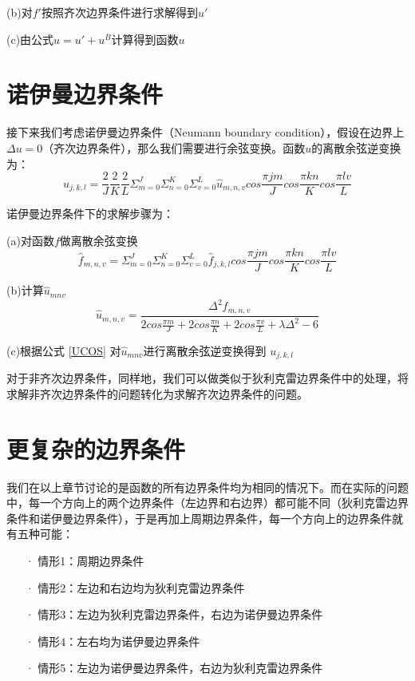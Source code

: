 (b)对$f'$按照齐次边界条件进行求解得到$u'$  

(c)由公式$u = u' + u^{B}$计算得到函数$u$

\section{诺伊曼边界条件}
接下来我们考虑诺伊曼边界条件（Neumann boundary condition），假设在边界上$\Delta u = 0$（齐次边界条件），那么我们需要进行余弦变换。函数$u$的离散余弦逆变换为：
\begin{equation} \label{UCOS}
u_{j,k,l}=\frac{2}{J}\frac{2}{K}\frac{2}{L}\Sigma_{m=0}^{J}\Sigma_{n=0}^{K}\Sigma_{v=0}^{L}
\hat{u}_{m,n,v}cos\frac{\pi jm}{J}cos\frac{\pi kn}{K}cos\frac{\pi lv}{L}
\end{equation}  

诺伊曼边界条件下的求解步骤为：  

(a)对函数$f$做离散余弦变换
\begin{equation}
\hat{f}_{m,n,v}=\Sigma_{m=0}^{J}\Sigma_{n=0}^{K}\Sigma_{v=0}^{L}
\hat{f}_{j,k,l}cos\frac{\pi jm}{J}cos\frac{\pi kn}{K}cos\frac{\pi lv}{L}
\end{equation}  

(b)计算$\hat{u}_{mnv}$
\begin{equation} \label{UMNV3}
\hat{u}_{m,n,v}= \frac{\Delta^2 \hat{f}_{m,n,v}}
{2cos\frac{\pi m}{J}+2cos\frac{\pi n}{K}+2cos\frac{\pi v}{L} + \lambda \Delta^2 - 6}
\end{equation} 

(c)根据公式 \eqref{UCOS} 对$\hat{u}_{mnv}$进行离散余弦逆变换得到 $u_{j,k,l}$  

对于非齐次边界条件，同样地，我们可以做类似于狄利克雷边界条件中的处理，将求解非齐次边界条件的问题转化为求解齐次边界条件的问题。


\section{更复杂的边界条件}
我们在以上章节讨论的是函数的所有边界条件均为相同的情况下。而在实际的问题中，每一个方向上的两个边界条件（左边界和右边界）都可能不同（狄利克雷边界条件和诺伊曼边界条件），于是再加上周期边界条件，每一个方向上的边界条件就有五种可能：

\begin{itemize}
\item[·]情形1：周期边界条件
\item[·]情形2：左边和右边均为狄利克雷边界条件
\item[·]情形3：左边为狄利克雷边界条件，右边为诺伊曼边界条件
\item[·]情形4：左右均为诺伊曼边界条件
\item[·]情形5：左边为诺伊曼边界条件，右边为狄利克雷边界条件
\end{itemize}  

